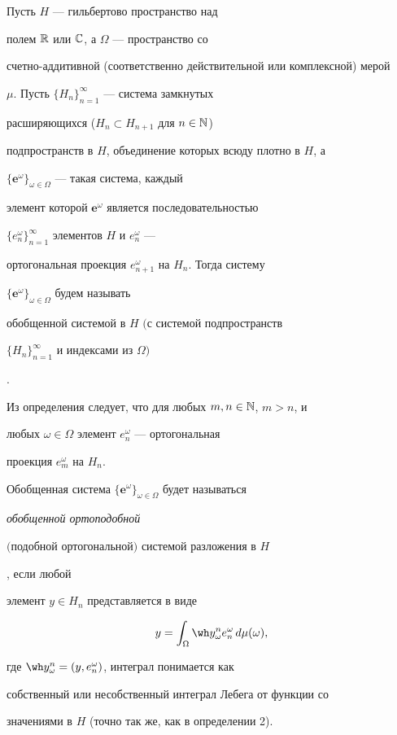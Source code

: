 \begin{defn}\hspace{-1.8mm}{\bf.}


Пусть $H$ --- гильбертово пространство над


полем $\Bbb R$ или $\Bbb C$, а $\Omega$ --- пространство со


счетно-аддитивной (соответственно действительной или комплексной) мерой


$\mu$. Пусть $\{H_n\}_{n=1}^\infty$ --- система замкнутых


расширяющихся ($H_n\subset H_{n+1}$ для $n\in\Bbb N$)


подпространств в $H$, объединение которых всюду плотно в $H$, а


$\{\boldsymbol e^\omega\}_{\omega\in\Omega}$ --- такая система, каждый


элемент которой $\boldsymbol e^\omega$ является последовательностью


$\{e^\omega_n\}_{n=1}^\infty$ элементов $H$ и $e^\omega_n$ ---


ортогональная проекция $e^\omega_{n+1}$ на $H_n$. Тогда систему


$\{\boldsymbol e^\omega\}_{\omega\in\Omega}$ будем называть {\it


обобщенной системой в $H$ $($с системой подпространств


$\{H_n\}_{n=1}^\infty$ и индексами из $\Omega)$}.


\end{defn}





Из определения следует, что для любых $m,n\in\Bbb N$, $m>n$, и


любых $\omega\in\Omega$ элемент $e^\omega_n$ --- ортогональная


проекция $e^\omega_m$ на $H_n$.





\begin{defn}\hspace{-1.8mm}{\bf.}


Обобщенная система $\{\boldsymbol e^\omega


\}_{\omega\in\Omega}$ будет называться {\it обобщенной ортоподобной


$($подобной ортогональной$)$ системой разложения в $H$}, если любой


элемент $y\in H_n$ представляется в виде


\begin{equation}


y=\int_\Omega\wh y^n_\omega e^\omega_n\,d\mu(\omega),


\end{equation}


где $\wh y^n_\omega=(y,e^\omega_n)$, интеграл понимается как


собственный или несобственный интеграл Лебега от функции со


значениями в $H$ (точно так же, как в определении 2).


\end{defn}






